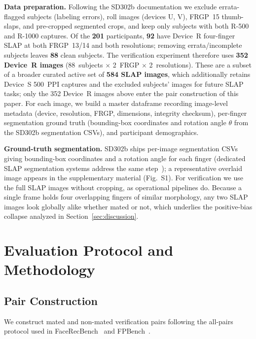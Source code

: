 \documentclass[runningheads]{llncs}
\begin{document}
\textbf{Data preparation.}
Following the SD302b documentation we exclude errata-flagged subjects
(labeling errors), roll images (devices U, V), FRGP~15 thumb-slaps, and
pre-cropped segmented crops, and keep only subjects with both R-500 and R-1000
captures. Of the \textbf{201} participants, \textbf{92} have Device~R
four-finger SLAP at both FRGP~13/14 and both resolutions; removing
errata/incomplete subjects leaves \textbf{88} clean subjects. The verification
experiment therefore uses \textbf{352 Device~R images}
(88~subjects $\times$ 2~FRGP $\times$ 2~resolutions).
These are a subset of a broader curated active set of \textbf{584 SLAP
images}, which additionally retains Device~S 500~PPI captures and the
excluded subjects' images for future SLAP tasks; only the 352 Device~R
images above enter the pair construction of this paper.
For each image, we build a master dataframe recording image-level
metadata (device, resolution, FRGP, dimensions, integrity checksum),
per-finger segmentation ground truth (bounding-box coordinates and
rotation angle $\theta$ from the SD302b segmentation CSVs), and
participant demographics.

\textbf{Ground-truth segmentation.}
SD302b ships per-image segmentation CSVs giving bounding-box coordinates and a
rotation angle for each finger (dedicated SLAP segmentation systems address the
same step~\cite{murshed2024SlapSeg}); a representative overlaid image appears in
the supplementary material (Fig.~S1). For verification we use the full SLAP
images without cropping, as operational pipelines do. Because a single frame
holds four overlapping fingers of similar morphology, any two SLAP images look
globally alike whether mated or not, which underlies the positive-bias collapse
analyzed in Section~\ref{sec:discussion}.

\section{Evaluation Protocol and Methodology}
\label{sec:method}

\subsection{Pair Construction}
\label{sec:pairs}

We construct mated and non-mated verification pairs following the
all-pairs protocol used in FaceRecBench~\cite{facerecbench2025} and
FPBench~\cite{fpbench2025}.
\end{document}
